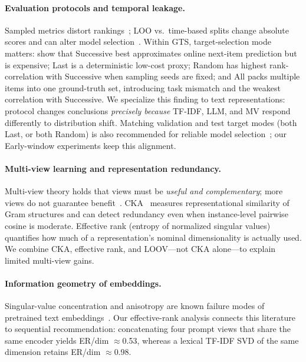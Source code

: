\documentclass[sigconf,natbib=true,anonymous]{acmart}
\newcommand{\tfidf}{\textsc{TF-IDF}\xspace}
\newcommand{\llm}{\textsc{LLM}\xspace}
\newcommand{\mv}{\textsc{MV}\xspace}
\begin{document}
\paragraph{Evaluation protocols and temporal leakage.}
Sampled metrics distort rankings~\cite{krichene2020sampledmetrics}; LOO vs.\ time-based splits change absolute scores and can alter model selection~\cite{ji2023evaluation,sun2023reevaluation,meng2020temporal}.
Within GTS, target-selection mode matters: \citet{liang2024timetosplit} show that Successive best approximates online next-item prediction but is expensive; Last is a deterministic low-cost proxy; Random has highest rank-correlation with Successive when sampling seeds are fixed; and All packs multiple items into one ground-truth set, introducing task mismatch and the weakest correlation with Successive.
We specialize this finding to text representations: protocol changes conclusions \emph{precisely because} \tfidf, \llm, and \mv respond differently to distribution shift.
Matching validation and test target modes (both Last, or both Random) is also recommended for reliable model selection~\cite{liang2024timetosplit}; our Early-window experiments keep this alignment.

\paragraph{Multi-view learning and representation redundancy.}
Multi-view theory holds that views must be \emph{useful and complementary}; more views do not guarantee benefit~\cite{xu2013multiview}.
CKA~\cite{kornblith2019cka} measures representational similarity of Gram structures and can detect redundancy even when instance-level pairwise cosine is moderate.
Effective rank (entropy of normalized singular values) quantifies how much of a representation's nominal dimensionality is actually used.
We combine CKA, effective rank, and LOOV---not CKA alone---to explain limited multi-view gains.

\paragraph{Information geometry of embeddings.}
Singular-value concentration and anisotropy are known failure modes of pretrained text embeddings~\cite{ethayarajh2019contextual}.
Our effective-rank analysis connects this literature to sequential recommendation: concatenating four prompt views that share the same encoder yields ER/dim $\approx$0.53, whereas a lexical \tfidf SVD of the same dimension retains ER/dim $\approx$0.98.
\end{document}
